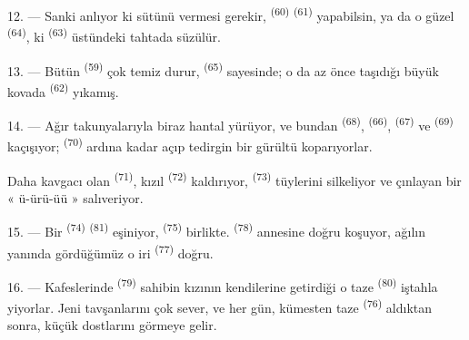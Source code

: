 12. --- Sanki anlıyor ki sütünü vermesi gerekir, 
\textsuperscript{(60)}  \textsuperscript{(61)}
 yapabilsin, ya da o güzel 
\textsuperscript{(64)}, ki  \textsuperscript{(63)} üstündeki
tahtada süzülür.

13. --- Bütün  \textsuperscript{(59)} çok temiz durur,
 \textsuperscript{(65)} sayesinde; o da az önce
taşıdığı büyük kovada  \textsuperscript{(62)}
yıkamış.

\VUsaut{3.0mm}
\VUsaut{3.0mm}

14. --- Ağır takunyalarıyla biraz hantal yürüyor, ve bundan
 \textsuperscript{(68)}, 
\textsuperscript{(66)},  \textsuperscript{(67)} ve
 \textsuperscript{(69)} kaçışıyor; 
\textsuperscript{(70)} ardına kadar açıp tedirgin bir gürültü koparıyorlar.

Daha kavgacı olan  \textsuperscript{(71)}, kızıl
 \textsuperscript{(72)} kaldırıyor, 
\textsuperscript{(73)} tüylerini silkeliyor ve çınlayan bir « ü-ürü-üü »
salıveriyor.

15. --- Bir  \textsuperscript{(74)}
 \textsuperscript{(81)} eşiniyor, 
\textsuperscript{(75)} birlikte. 
\textsuperscript{(78)} annesine doğru koşuyor, ağılın yanında gördüğümüz o iri
 \textsuperscript{(77)} doğru.

16. --- Kafeslerinde  \textsuperscript{(79)} sahibin kızının
kendilerine getirdiği o taze  \textsuperscript{(80)} iştahla
yiyorlar. Jeni tavşanlarını çok sever, ve her gün, kümesten taze
 \textsuperscript{(76)} aldıktan sonra, küçük dostlarını
görmeye gelir.
\VUsaut{6.0mm}
\VUfilet{22mm}
